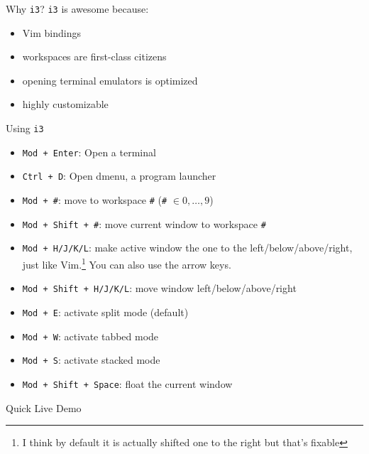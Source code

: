 \documentclass{lug}
\newcommand{\ithree}{\texttt{i3}\xspace}
\begin{document}
\begin{frame}{Why \ithree?}
    \ithree is awesome because:
    \begin{itemize}
        \item Vim bindings
        \item workspaces are first-class citizens
        \item opening terminal emulators is optimized
        \item highly customizable
    \end{itemize}
\end{frame}

\begin{frame}{Using \ithree}
    \begin{itemize}
        \item \texttt{Mod + Enter}: Open a terminal
        \item \texttt{Ctrl + D}: Open dmenu, a program launcher
        \item \texttt{Mod + \#}: move to workspace \texttt{\#} (\texttt{\#} $\in
            {0,\dots,9}$)
        \item \texttt{Mod + Shift + \#}: move current window to workspace
            \texttt{\#}
        \item \texttt{Mod + H/J/K/L}: make active window the one to the
            left/below/above/right, just like Vim.\footnote[frame]{I think by
            default it is actually shifted one to the right but that's fixable}
            You can also use the arrow keys.
        \item \texttt{Mod + Shift + H/J/K/L}: move window left/below/above/right
        \item \texttt{Mod + E}: activate split mode (default)
        \item \texttt{Mod + W}: activate tabbed mode
        \item \texttt{Mod + S}: activate stacked mode
        \item \texttt{Mod + Shift + Space}: float the current window
    \end{itemize}
    \hspace{1em}
\end{frame}

\begin{frame}[standout]
    \Huge
    Quick Live Demo
\end{frame}
\end{document}
